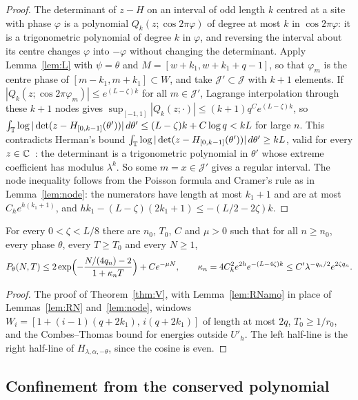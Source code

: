 \begin{proof}
The determinant of $z-H$ on an interval of odd length $k$ centred at a site with phase $\varphi$ is a polynomial $Q_k(z;\cos2\pi\varphi)$ of degree at most $k$ in $\cos2\pi\varphi$: it is a trigonometric polynomial of degree $k$ in $\varphi$, and reversing the interval about its centre changes $\varphi$ into $-\varphi$ without changing the determinant. Apply Lemma~\ref{lem:L} with $\psi=\theta$ and $M=[w+k_1,w+k_1+q-1]$, so that $\varphi_m$ is the centre phase of $[m-k_1,m+k_1]\subset W$, and take $\mathcal J'\subset\mathcal J$ with $k+1$ elements. If $|Q_k(z;\cos2\pi\varphi_m)|\le e^{(L-\zeta)k}$ for all $m\in\mathcal J'$, Lagrange interpolation through these $k+1$ nodes gives $\sup_{[-1,1]}|Q_k(z;\cdot)|\le(k+1)q^{C}e^{(L-\zeta)k}$, so $\int_\mathbb T\log|\det(z-H_{[0,k-1]}(\theta'))|\,d\theta'\le(L-\zeta)k+C\log q<kL$ for large $n$. This contradicts Herman's bound $\int_\mathbb T\log|\det(z-H_{[0,k-1]}(\theta'))|\,d\theta'\ge kL$, valid for every $z\in\mathbb C$~\cite[proof of Lemma~6.2]{DMamo}: the determinant is a trigonometric polynomial in $\theta'$ whose extreme coefficient has modulus $\lambda^k$. So some $m=x\in\mathcal J'$ gives a regular interval. The node inequality follows from the Poisson formula and Cramer's rule as in Lemma~\ref{lem:node}: the numerators have length at most $k_1+1$ and are at most $C_he^{h(k_1+1)}$, and $hk_1-(L-\zeta)(2k_1+1)\le-(L/2-2\zeta)k$.
\end{proof}

\begin{theorem}\label{thm:Vamo}
For every $0<\zeta<L/8$ there are $n_0$, $T_0$, $C$ and $\mu>0$ such that for all $n\ge n_0$, every phase $\theta$, every $T\ge T_0$ and every $N\ge1$,
\[
P_\theta(N,T)\le2\exp\Bigl(-\frac{N/(4q_n)-2}{1+\kappa_nT}\Bigr)+Ce^{-\mu N},\qquad\kappa_n=4C_h^2e^{2h}e^{-(L-4\zeta)k}\le C'\lambda^{-q_n/2}e^{2\zeta q_n}.
\]
\end{theorem}

\begin{proof}
The proof of Theorem~\ref{thm:V}, with Lemma~\ref{lem:RNamo} in place of Lemmas~\ref{lem:RN} and~\ref{lem:node}, windows $W_i=[1+(i-1)(q+2k_1),\,i(q+2k_1)]$ of length at most $2q$, $T_0\ge1/r_0$, and the Combes--Thomas bound for energies outside $U'_h$. The left half-line is the right half-line of $H_{\lambda,\alpha,-\theta}$, since the cosine is even.
\end{proof}

\subsection{Confinement from the conserved polynomial}


